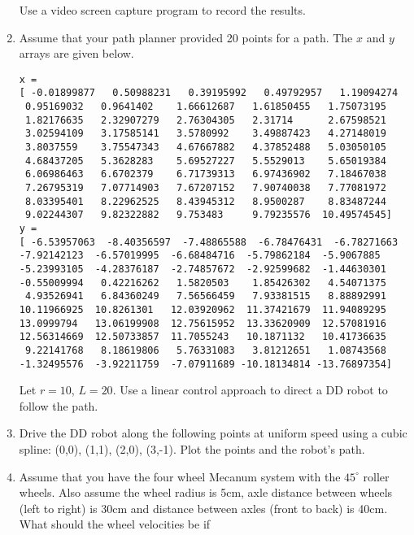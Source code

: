 \begin{enumerate}
  Use a video screen capture program to record the results.
\item
  Assume that your path planner provided 20 points for a path. The \(x\)
  and \(y\) arrays are given below.

\begin{verbatim}
x =
[ -0.01899877   0.50988231   0.39195992   0.49792957   1.19094274
 0.95169032   0.9641402    1.66612687   1.61850455   1.75073195
 1.82176635   2.32907279   2.76304305   2.31714      2.67598521
 3.02594109   3.17585141   3.5780992    3.49887423   4.27148019
 3.8037559    3.75547343   4.67667882   4.37852488   5.03050105
 4.68437205   5.3628283    5.69527227   5.5529013    5.65019384
 6.06986463   6.6702379    6.71739313   6.97436902   7.18467038
 7.26795319   7.07714903   7.67207152   7.90740038   7.77081972
 8.03395401   8.22962525   8.43945312   8.9500287    8.83487244
 9.02244307   9.82322882   9.753483     9.79235576  10.49574545]
y =
[ -6.53957063  -8.40356597  -7.48865588  -6.78476431  -6.78271663
-7.92142123  -6.57019995  -6.68484716  -5.79862184  -5.9067885
-5.23993105  -4.28376187  -2.74857672  -2.92599682  -1.44630301
-0.55009994   0.42216262   1.5820503    1.85426302   4.54071375
 4.93526941   6.84360249   7.56566459   7.93381515   8.88892991
10.11966925  10.8261301   12.03920962  11.37421679  11.94089295
13.0999794   13.06199908  12.75615952  13.33620909  12.57081916
12.56314669  12.50733857  11.7055243   10.1871132   10.41736635
 9.22141768   8.18619806   5.76331083   3.81212651   1.08743568
-1.32495576  -3.92211759  -7.07911689 -10.18134814 -13.76897354]
\end{verbatim}

  Let \(r=10\), \(L=20\). Use a linear control approach to direct a DD
  robot to follow the path.
\item
  Drive the DD robot along the following points at uniform speed using a
  cubic spline: (0,0), (1,1), (2,0), (3,-1). Plot the points and the
  robot's path.
\item
  Assume that you have the four wheel Mecanum system with the
  \(45^{\circ}\) roller wheels. Also assume the wheel radius is 5cm,
  axle distance between wheels (left to right) is 30cm and distance
  between axles (front to back) is 40cm. What should the wheel
  velocities be if


\end{enumerate}
